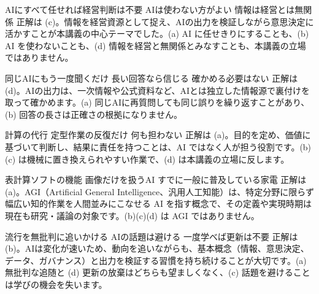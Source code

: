 
%
  {AIにすべて任せれば経営判断は不要}%
  {AIは使わない方がよい}%
  {}%
  {情報は経営とは無関係}%
  {正解は (c)。情報を経営資源として捉え、AIの出力を検証しながら意思決定に活かすことが本講義の中心テーマでした。(a) AI に任せきりにすることも、(b) AI を使わないことも、(d) 情報を経営と無関係とみなすことも、本講義の立場ではありません。}

%
  {同じAIにもう一度聞くだけ}%
  {長い回答なら信じる}%
  {確かめる必要はない}%
  {}%
  {正解は (d)。AIの出力は、一次情報や公式資料など、AIとは独立した情報源で裏付けを取って確かめます。(a) 同じAIに再質問しても同じ誤りを繰り返すことがあり、(b) 回答の長さは正確さの根拠になりません。}

%
  {}%
  {計算の代行}%
  {定型作業の反復だけ}%
  {何も担わない}%
  {正解は (a)。目的を定め、価値に基づいて判断し、結果に責任を持つことは、AI ではなく人が担う役割です。(b)(c) は機械に置き換えられやすい作業で、(d) は本講義の立場に反します。}

%
  {}%
  {表計算ソフトの機能}%
  {画像だけを扱うAI}%
  {すでに一般に普及している家電}%
  {正解は (a)。AGI（Artificial General Intelligence、汎用人工知能）は、特定分野に限らず幅広い知的作業を人間並みにこなせる AI を指す概念で、その定義や実現時期は現在も研究・議論の対象です。(b)(c)(d) は AGI ではありません。}

%
  {流行を無批判に追いかける}%
  {}%
  {AIの話題は避ける}%
  {一度学べば更新は不要}%
  {正解は (b)。AIは変化が速いため、動向を追いながらも、基本概念（情報、意思決定、データ、ガバナンス）と出力を検証する習慣を持ち続けることが大切です。(a) 無批判な追随と (d) 更新の放棄はどちらも望ましくなく、(c) 話題を避けることは学びの機会を失います。}
